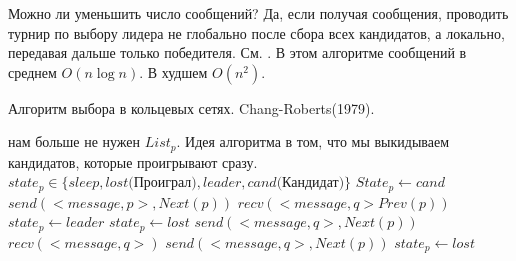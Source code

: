 Можно ли уменьшить число сообщений? Да, если получая сообщения, проводить турнир по выбору лидера не глобально после сбора всех кандидатов, а локально, передавая дальше только победителя. См. . В этом алгоритме сообщений в среднем $O(n\log n)$. В худшем $O(n^2)$.
\begin{algorithm}
	\caption{Алгоритм выбора в кольцевых сетях. Chang-Roberts(1979).}
	\label{algRoberts}
	\begin{algorithmic}
		\State нам больше не нужен $List_p$. Идея алгоритма в том, что мы выкидываем кандидатов, которые проигрывают сразу.
		\State $state_p \in \{sleep, lost\text{(Проиграл)}, leader, cand\text{(Кандидат)}\}$ 
		\State $State_p \gets cand$
		\State $send(<message, p>, Next(p))$ 
		\State $recv(<message, q> Prev(p))$ 
		$state_p \gets leader$
		 
		\State $state_p \gets lost$
		\State $send(<message, q>, Next(p))$
		\EndIf
		\EndIf
		\EndWhile
		\Else[Не инициаторы] 
		\State $recv(<message, q>)$ 
		\State $send(<message, q>, Next(p))$ 
		\State $state_p \gets lost$
		\EndIf
		\EndWhile
		\EndIf 
	\end{algorithmic}
\end{algorithm}

